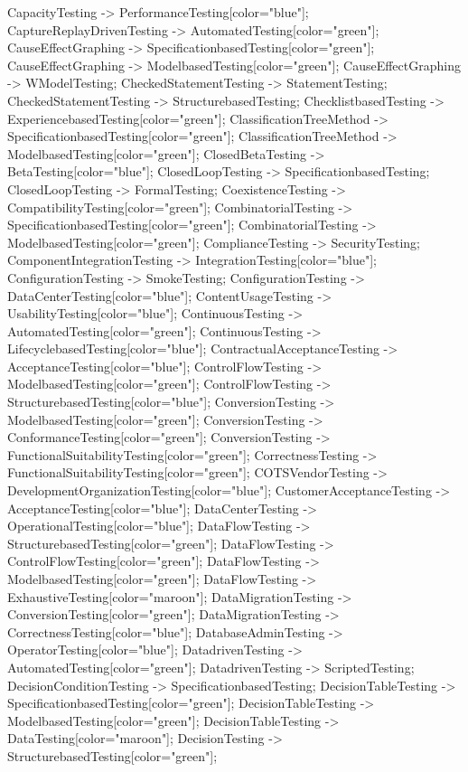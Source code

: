 \documentclass{article}
\begin{document}
{CapacityTesting -> PerformanceTesting[color="blue"];
CaptureReplayDrivenTesting -> AutomatedTesting[color="green"];
CauseEffectGraphing -> SpecificationbasedTesting[color="green"];
CauseEffectGraphing -> ModelbasedTesting[color="green"];
CauseEffectGraphing -> WModelTesting;
CheckedStatementTesting -> StatementTesting;
CheckedStatementTesting -> StructurebasedTesting;
ChecklistbasedTesting -> ExperiencebasedTesting[color="green"];
ClassificationTreeMethod -> SpecificationbasedTesting[color="green"];
ClassificationTreeMethod -> ModelbasedTesting[color="green"];
ClosedBetaTesting -> BetaTesting[color="blue"];
ClosedLoopTesting -> SpecificationbasedTesting;
ClosedLoopTesting -> FormalTesting;
CoexistenceTesting -> CompatibilityTesting[color="green"];
CombinatorialTesting -> SpecificationbasedTesting[color="green"];
CombinatorialTesting -> ModelbasedTesting[color="green"];
ComplianceTesting -> SecurityTesting;
ComponentIntegrationTesting -> IntegrationTesting[color="blue"];
ConfigurationTesting -> SmokeTesting;
ConfigurationTesting -> DataCenterTesting[color="blue"];
ContentUsageTesting -> UsabilityTesting[color="blue"];
ContinuousTesting -> AutomatedTesting[color="green"];
ContinuousTesting -> LifecyclebasedTesting[color="blue"];
ContractualAcceptanceTesting -> AcceptanceTesting[color="blue"];
ControlFlowTesting -> ModelbasedTesting[color="green"];
ControlFlowTesting -> StructurebasedTesting[color="blue"];
ConversionTesting -> ModelbasedTesting[color="green"];
ConversionTesting -> ConformanceTesting[color="green"];
ConversionTesting -> FunctionalSuitabilityTesting[color="green"];
CorrectnessTesting -> FunctionalSuitabilityTesting[color="green"];
COTSVendorTesting -> DevelopmentOrganizationTesting[color="blue"];
CustomerAcceptanceTesting -> AcceptanceTesting[color="blue"];
DataCenterTesting -> OperationalTesting[color="blue"];
DataFlowTesting -> StructurebasedTesting[color="green"];
DataFlowTesting -> ControlFlowTesting[color="green"];
DataFlowTesting -> ModelbasedTesting[color="green"];
DataFlowTesting -> ExhaustiveTesting[color="maroon"];
DataMigrationTesting -> ConversionTesting[color="green"];
DataMigrationTesting -> CorrectnessTesting[color="blue"];
DatabaseAdminTesting -> OperatorTesting[color="blue"];
DatadrivenTesting -> AutomatedTesting[color="green"];
DatadrivenTesting -> ScriptedTesting;
DecisionConditionTesting -> SpecificationbasedTesting;
DecisionTableTesting -> SpecificationbasedTesting[color="green"];
DecisionTableTesting -> ModelbasedTesting[color="green"];
DecisionTableTesting -> DataTesting[color="maroon"];
DecisionTesting -> StructurebasedTesting[color="green"];
}
\end{document}
